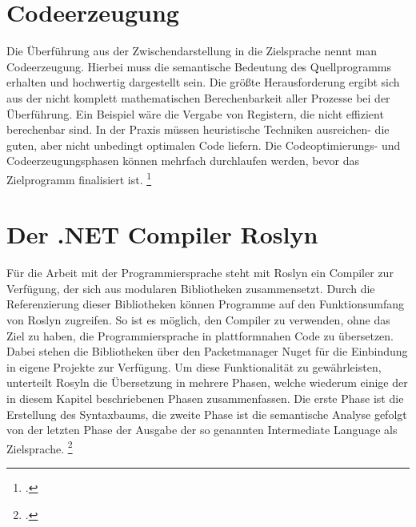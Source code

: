 \section{Codeerzeugung}
Die Überführung aus der Zwischendarstellung in die Zielsprache nennt man Codeerzeugung.  Hierbei muss die semantische Bedeutung des Quellprogramms erhalten und hochwertig dargestellt sein. Die größte Herausforderung ergibt sich aus der nicht komplett mathematischen Berechenbarkeit aller Prozesse bei der Überführung. Ein Beispiel wäre die Vergabe von Registern,  die nicht effizient berechenbar sind.  In der Praxis müssen heuristische Techniken ausreichen- die guten, aber nicht unbedingt optimalen Code liefern.  Die Codeoptimierungs- und  Codeerzeugungsphasen können mehrfach durchlaufen werden,  bevor das Zielprogramm finalisiert ist. \footcite[Vgl.][S. 618f]{Ullmann2008}

\section{Der .NET Compiler Roslyn}
Für die Arbeit mit der Programmiersprache \Csharp  steht mit Roslyn ein Compiler zur Verfügung, der sich aus modularen Bibliotheken zusammensetzt.  Durch die Referenzierung dieser Bibliotheken können Programme auf den Funktionsumfang von Roslyn zugreifen.  So ist es möglich, den Compiler zu verwenden, ohne das Ziel zu haben, die Programmiersprache \Csharp  in plattformnahen Code zu übersetzen.  Dabei stehen die Bibliotheken über den Packetmanager Nuget für die Einbindung in eigene Projekte zur Verfügung.  Um diese Funktionalität zu gewährleisten,  unterteilt Rosyln die Übersetzung in mehrere Phasen,  welche wiederum einige der in diesem Kapitel beschriebenen Phasen zusammenfassen. Die erste Phase ist die Erstellung des Syntaxbaums, die zweite Phase ist die semantische Analyse gefolgt von der letzten Phase der Ausgabe der so genannten Intermediate Language als Zielsprache. \footcite[Vgl.][S. 1017]{Albahari2020}



